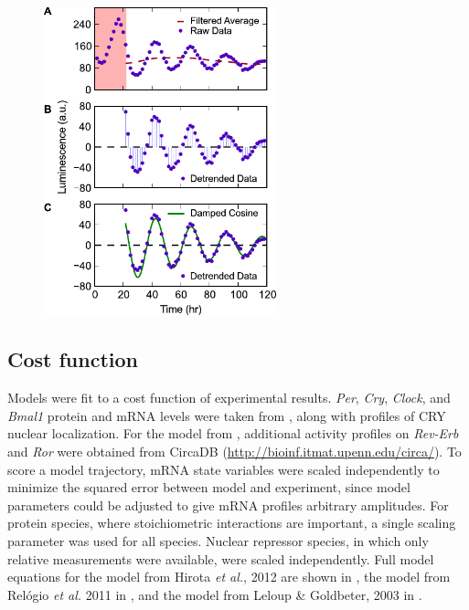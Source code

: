 \begin{figure}[p]
  \centering
  \includegraphics[width=0.6\textwidth]{chap4/figures/figS1.pdf}
  \label{fig:4s1}
\end{figure}

\subsection{Cost function}
Models were fit to a cost function of experimental results. 
{\it Per}, {\it Cry}, {\it Clock}, and {\it Bmal1} protein and mRNA levels were taken from \cite{Lee2001}, along with profiles of CRY nuclear localization. 
For the model from \cite{Relogio2011}, additional activity profiles on {\it Rev-Erb} and {\it Ror} were obtained from CircaDB (\url{http://bioinf.itmat.upenn.edu/circa/}). 
To score a model trajectory, mRNA state variables were scaled independently to minimize the squared error between model and experiment, since model parameters could be adjusted to give mRNA profiles arbitrary amplitudes. 
For protein species, where stoichiometric interactions are important, a single scaling parameter was used for all species. 
Nuclear repressor species, in which only relative measurements were available, were scaled independently. 
Full model equations for the model from Hirota {\itshape et al.}, 2012 are shown in , the model from Rel\'{o}gio {\itshape et al.} 2011 in , and the model from Leloup \& Goldbeter, 2003 in .

